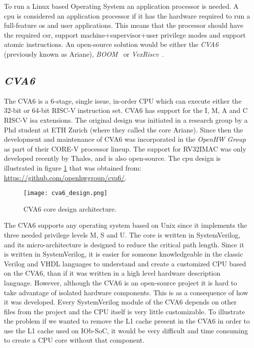 To run a Linux based Operating System an application processor is needed. A \acrshort{cpu} is considered an application processor if it has the hardware required to run a full-feature \acrfull{os} and user applications. This means that the processor should have the required \acrfull{csr}, support \acrshort{machine}+\acrshort{supervisor}+\acrshort{user} privilege modes and support atomic instructions. An open-source solution would be either the \textit{CVA6}~\cite{zaruba2019cost} (previously known as Ariane), \textit{BOOM}~\cite{zhaosonicboom} or \textit{VexRiscv}~\cite{vexriscv}.

\subsection{\textit{CVA6}}
The CVA6 is a 6-stage, single issue, in-order CPU which can execute either the 32-bit or 64-bit RISC-V instruction set. CVA6 has support for the I, M, A and C RISC-V \acrshort{isa} extensions. The original design was initiated in a research group by a Phd student at ETH Zurich (where they called the core Ariane). Since then the development and maintenance of CVA6 was incorporated in the \textit{OpenHW Group} as part of their CORE-V processor lineup. The support for RV32IMAC was only developed recently by Thales, and is also open-source. The \acrshort{cpu} design is illustrated in figure \ref{fig:cva6_design} that was obtained from: \url{https://github.com/openhwgroup/cva6/}.

\begin{figure}[!h]
    \centering
    \texttt{[image: cva6\_design.png]}
    \caption{CVA6 core design architecture.}
    \label{fig:cva6_design}
\end{figure}

The CVA6 supports any operating system based on Unix since it implements the three needed privilege levels M, S and U. The core is written in SystemVerilog, and its micro-architecture is designed to reduce the critical path length. Since it is written in SystemVerilog, it is easier for someone knowledgeable in the classic Verilog and VHDL languages to understand and create a customized CPU based on the CVA6, than if it was written in a high level hardware description language. However, although the CVA6 is an open-source project it is hard to take advantage of isolated hardware components. This is as  a consequence of how it was developed. Every SystemVerilog module of the CVA6 depends on other files from the project and the CPU itself is very little customizable. To illustrate the problem if we wanted to remove the L1 cache present in the CVA6 in order to use the L1 cache used on IOb-SoC, it would be very difficult and time consuming to create a CPU core without that component.

